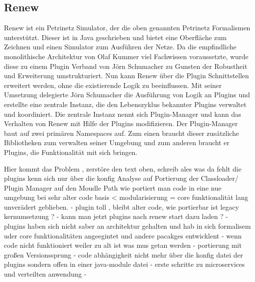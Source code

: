 \subsection{Renew} %
Renew ist ein Petrinetz Simulator, der die oben genannten Petrinetz Formalismen unterstützt. Dieser ist in Java geschrieben und bietet eine Oberfläche zum Zeichnen und einen Simulator zum Ausführen der Netze. \newline 
Da die empfindliche monolithische Architektur von Olaf Kummer viel Fachwissen voraussetzte, wurde diese zu einem Plugin Verband von Jörn Schumacher zu Gunsten der Robustheit und Erweiterung umstrukturiert. Nun kann Renew über die Plugin Schnittstellen erweitert werden, ohne die existierende Logik zu beeinflussen. \bigbreak
Mit seiner Umsetzung delegierte Jörn Schumacher die Ausführung von Logik an Plugins und erstellte eine zentrale Instanz, die den Lebenszyklus bekannter Plugins verwaltet und koordiniert. Die zentrale Instanz nennt sich Plugin-Manager und kann das Verhalten von Renew mit Hilfe der Plugins modifizieren.
Der Plugin-Manager baut auf zwei primären Namespaces auf. Zum einen braucht dieser zusätzliche Bibliotheken zum verwalten seiner Umgebung und zum anderen braucht er Plugins, die Funktionalität mit sich bringen. 
\bigbreak 

Hier kommt das Problem , zerstöre den text oben, schreib ales was da fehlt 
die plugins kenn sich  nur über die konfig 
Analyse auf Portierung der Classloader/ Plugin Manager auf den Moudle Path 
wie portiert man code in eine nue umgebung bei sehr alter code basis < modularisierung = core funktionalität lang unverädert geblieben.
- plugin toll , bleibt alter code, wie portierbar ist legacy  kernumsetzung ?
- kann man jetzt plugins nach renew start  dazu laden ?
- plugins haben sich nicht saber an  architektur gehalten und hab in sich formalisem uder core funktionalitäten angeegintet  und andere pacakges entwicklent 
- wenn code nicht funktioniert weiler zu alt ist was mus getan werden 
- portierung  mit großen Versionssprung 
- code abhängigkeit nicht mehr über die konfig datei der plugins sondern offen in einer java-module datei
- erste schritte zu microservices und verteilten anwendung 
- 







